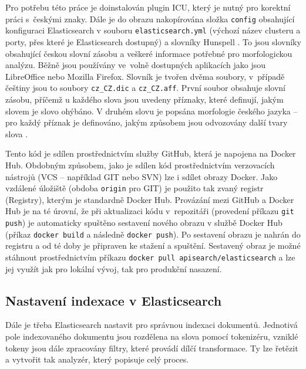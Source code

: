 \documentclass[FM,DP]{tulthesis}
\begin{document}
Pro potřebu této práce je doinstalován plugin ICU, který je nutný pro korektní práci 
s~českými znaky. Dále je do obrazu nakopírována složka \verb|config| obsahující konfiguraci
Elasticsearch v souboru \verb|elasticsearch.yml| (výchozí název clusteru a porty, přes které 
je Elasticsearch dostupný) a slovníky Hunspell \cite{hunspell}. To jsou slovníky obsahující 
českou slovní zásobu a veškeré informace potřebné pro morfologickou analýzu. Běžně jsou používány 
ve~volně dostupných aplikacích jako jsou LibreOffice \cite{hunspell-download} nebo Mozilla Firefox. 
Slovník je tvořen dvěma soubory, v~případě češtiny jsou to soubory \verb|cz_CZ.dic| a \verb|cz_CZ.aff|. 
První soubor obsahuje slovní zásobu, příčemž u každého slova jsou uvedeny příznaky, 
které definují, jakým slovem je slovo ohýbáno. V druhém slovu je popsána morfologie českého
jazyka -- pro každý příznak je definováno, jakým způsobem jsou odvozovány další tvary
slova \cite{hunspell-man}.

Tento kód je sdílen prostřednictvím služby GitHub, která je napojena na Docker Hub. 
Obdobným způsobem, jako je sdílen kód prostřednictvím verzovacích nástrojů (VCS --
například GIT nebo SVN) lze i sdílet obrazy Docker. Jako vzdálené úložiště (obdoba 
\verb|origin| pro GIT) je použito tak zvaný registr (Registry), kterým je standardně
Docker Hub. Provázání mezi GitHub a Docker Hub je na té úrovní, že při aktualizaci 
kódu v~repozitáři (provedení příkazu \verb|git push|) je automaticky spuštěno sestavení 
nového obrazu v službě Docker Hub (příkaz \verb|docker build| a následně \verb|docker push|).
Po sestavení obrazu je nahrán do registru a od té doby je připraven ke stažení a spuštění.
Sestavený obraz je možné stáhnout prostřednictvím příkazu \verb|docker pull apisearch/elasticsearch|
a lze jej využít jak pro lokální vývoj, tak pro produkční nasazení.

\subsection{Nastavení indexace v Elasticsearch}

Dále je třeba Elasticsearch nastavit pro správnou indexaci dokumentů. Jednotivá pole indexovaného
dokumentu jsou rozdělena na slova pomocí tokenizéru, vzniklé tokeny jsou dále zpracovány filtry, 
které provádí dílčí transformace. Ty lze řetězit a vytvořit tak analyzér, který popisuje
celý proces.

\end{document}
